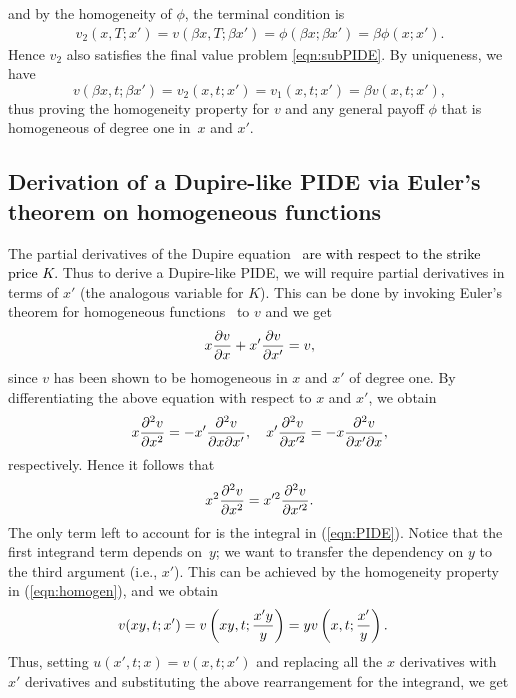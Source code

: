and by the homogeneity of $\phi$, the terminal condition is
	\begin{align*}
		v_2(x,T;x') = v\left( \beta x, T; \beta x' \right) = \phi(\beta x; \beta x') = \beta \phi(x;x').
	\end{align*}
Hence $v_2$ also satisfies the final value problem \eqref{eqn:subPIDE}. By uniqueness, we have
	\begin{equation*}
		v\left(\beta x, t; \beta x'\right) = v_2(x,t;x') = v_1(x,t;x') = \beta v(x,t;x'),
	\end{equation*}
thus proving the homogeneity property for $v$ and any general payoff $\phi$ that is homogeneous of degree one in~$x$ and $x'$.

\subsection{Derivation of a Dupire-like PIDE via Euler's theorem on homogeneous functions}
The partial derivatives of the Dupire equation~\cite{Gatheral2006} \textcolor{black}{are with respect to the strike price $K$.} Thus to derive a Dupire-like PIDE, we will require partial derivatives in terms of $x'$ (the analogous variable for $K$). This can be done by invoking Euler's theorem for homogeneous functions~\cite[pp. 317]{Kishan2007} to $v$ and we get
	\begin{equation*}
		x\frac{\partial v}{\partial x} + x'\frac{\partial v}{\partial x'} = v,
	\end{equation*}
since $v$ has been shown to be homogeneous in $x$ and $x'$ of degree one. By differentiating the above equation with respect to $x$ and $x'$, we obtain
	\begin{equation*}
		x\frac{\partial^2 v}{\partial x^2} = -x'\frac{\partial^2 v}{\partial x \partial x'}, \quad x'\frac{\partial^2 v}{\partial x'^2} = -x\frac{\partial^2 v}{\partial x' \partial x},
	\end{equation*}
respectively. Hence it follows that
	\begin{equation*}
		x^2\frac{\partial^2 v}{\partial x^2} = x'^2\frac{\partial^2 v}{\partial x'^2}.
	\end{equation*}
The only term left to account for is the integral in (\ref{eqn:PIDE}). Notice that the first integrand term depends on~$y$; we want to transfer the dependency on $y$ to the third argument (i.e., $x'$). This can be achieved by the homogeneity property in (\ref{eqn:homogen}), and we obtain
	\begin{align*}
		v(xy,t; x') &= v\left(xy,t;\frac{x'y}{y}\right) = yv\left( x,t;\frac{x'}{y} \right).
	\end{align*}
Thus, setting $u(x',t; x) = v(x,t; x')$ and replacing all the $x$ derivatives with $x'$ derivatives and substituting the above rearrangement for the integrand, we get
